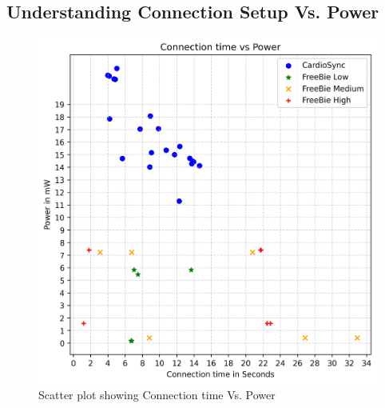 


\subsection{Understanding Connection Setup Vs. Power}
\begin{figure}[t]
    \centering
    \includegraphics[width=0.7\linewidth]{chapters/Results/Scatter_plot.png}
    \caption{Scatter plot showing Connection time Vs. Power}
    \label{fig:scatter_conn_power}
\end{figure}

